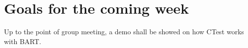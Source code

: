 \documentclass{article}
\begin{document}
\section{Goals for the coming week}
Up to the point of group meeting, a demo shall be showed on how CTest works with BART.





%
%
%

\end{document}
